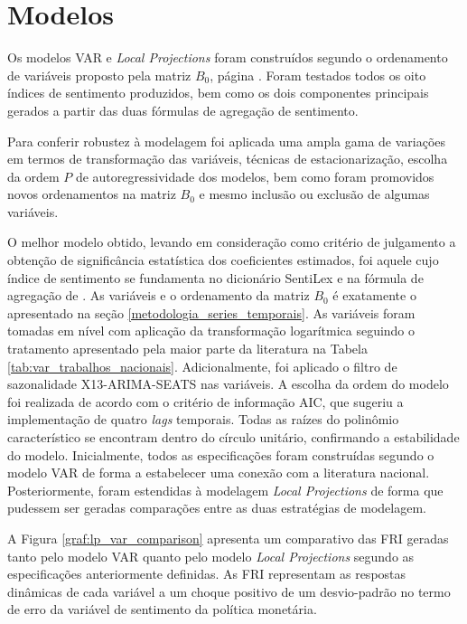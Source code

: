 \clearpage

\section{Modelos}

Os modelos VAR e \textit{Local Projections} foram construídos segundo o ordenamento de variáveis proposto pela matriz \(B_0\), página \pageref{matrix:matriz_b_ordenamento}. Foram testados todos os oito índices de sentimento produzidos, bem como os dois componentes principais gerados a partir das duas fórmulas de agregação de sentimento. 

Para conferir robustez à modelagem foi aplicada uma ampla gama de variações em termos de transformação das variáveis, técnicas de estacionarização, escolha da ordem \(P\) de autoregressividade dos modelos, bem como foram promovidos novos ordenamentos na matriz \(B_0\) e mesmo inclusão ou exclusão de algumas variáveis. 

O melhor modelo obtido, levando em consideração como critério de julgamento a obtenção de significância estatística dos coeficientes estimados, foi aquele cujo índice de sentimento se fundamenta no dicionário SentiLex e na fórmula de agregação de \textcite{carosia_analyzing_2020}. As variáveis e o ordenamento da matriz \(B_0\) é exatamente o apresentado na seção \ref{metodologia_series_temporais}. As variáveis foram tomadas em nível com aplicação da transformação logarítmica seguindo o tratamento apresentado pela maior parte da literatura na Tabela \ref{tab:var_trabalhos_nacionais}. Adicionalmente, foi aplicado o filtro de sazonalidade X13-ARIMA-SEATS nas variáveis. A escolha da ordem do modelo foi realizada de acordo com o critério de informação AIC, que sugeriu a implementação de quatro \textit{lags} temporais. Todas as raízes do polinômio característico se encontram dentro do círculo unitário, confirmando a estabilidade do modelo. Inicialmente, todos as especificações foram construídas segundo o modelo VAR de forma a estabelecer uma conexão com a literatura nacional. Posteriormente, foram estendidas à modelagem \textit{Local Projections} de forma que pudessem ser geradas comparações entre as duas estratégias de modelagem. 

A Figura \ref{graf:lp_var_comparison} apresenta um comparativo das FRI geradas tanto pelo modelo VAR quanto pelo modelo \textit{Local Projections} segundo as especificações anteriormente definidas. As FRI representam as respostas dinâmicas de cada variável a um choque positivo de um desvio-padrão no termo de erro da variável de sentimento da política monetária. 

